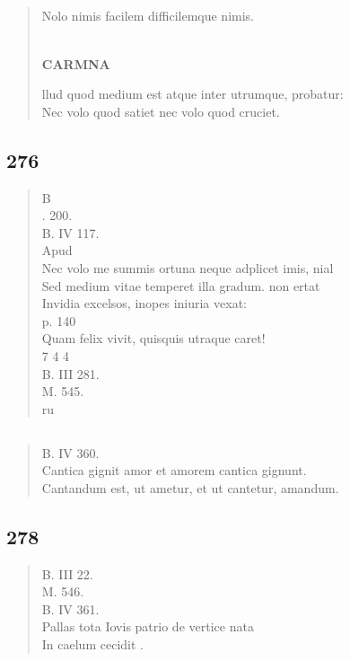 \documentclass[11pt, a4paper]{report}
\begin{document}
            \subsection*{}
      \begin{verse}
      Nolo nimis facilem difficilemque nimis. \\ 
        ﻿\pagebreak 
    \begin{center} \textbf{CARMNA} \end{center} \marginpar{[218]} llud quod medium est atque inter utrumque, probatur: \\ Nec volo quod satiet nec volo quod cruciet. \\ 
      \end{verse}
  
            \subsection*{276}
      \begin{verse}
      B \\ . 200. \\ B. IV 117. \\ Apud \\ Nec volo me summis ortuna neque adplicet imis, nial \\ Sed medium vitae temperet illa gradum. non ertat \\ Invidia excelsos, inopes iniuria vexat: \\ p. 140 \\ Quam felix vivit, quisquis utraque caret! \\ 7 4 4 \\ B. III 281. \\ M. 545. \\ ru \\ 
      \end{verse}
  
            \subsection*{}
      \begin{verse}
      B. IV 360. \\ Cantica gignit amor et amorem cantica gignunt. \\ Cantandum est, ut ametur, et ut cantetur, amandum. \\ 
      \end{verse}
  
            \subsection*{278}
      \begin{verse}
      B. III 22. \\ M. 546. \\ B. IV 361. \\ Pallas tota Iovis patrio de vertice nata \\ In caelum cecidit . \\ 
      \end{verse}
  
\end{document}
